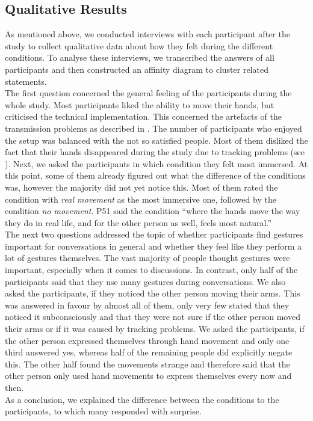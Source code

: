 \documentclass[english,runningheads,a4paper]{llncs}[2018/03/10]
\begin{document}
\subsection{Qualitative Results}
As mentioned above, we conducted interviews with each participant after the study to collect qualitative data about how they felt during the different conditions. 
To analyse these interviews, we transcribed the answers of all participants and then constructed an affinity diagram to cluster related statements.  \\ \linebreak
The first question concerned the general feeling of the participants during the whole study.
Most participants liked the ability to move their hands, but criticised the technical implementation. 
This concerned the artefacts of the transmission problems as described in .
The number of participants who enjoyed the setup was balanced with the not so satisfied people. 
Most of them disliked the fact that their hands disappeared during the study due to tracking problems (see ).
Next, we asked the participants in which condition they felt most immersed. 
At this point, some of them already figured out what the difference of the conditions was, however the majority did not yet notice this. 
Most of them rated the condition with \textit{real movement} as the most immersive one, followed by the condition \textit{no movement}. 
P51 said the condition ``where the hands move the way they do in real life, and for the other person as well, feels most natural.''\\ \linebreak
The next two questions addressed the topic of whether participants find gestures important for conversations in general and whether they feel like they perform a lot of gestures themselves. 
The vast majority of people thought gestures were important, especially when it comes to discussions.
In contrast, only half of the participants said that they use many gestures during conversations. 
We also asked the participants, if they noticed the other person moving their arms. 
This was answered in favour by almost all of them, only very few stated that they noticed it subconsciously and that they were not sure if the other person moved their arms or if it was caused by tracking problems. 
We asked the participants, if the other person expressed themselves through hand movement and only one third answered yes, whereas half of the remaining people did explicitly negate this.
The other half found the movements strange and therefore said that the other person only used hand movements to express themselves every now and then. \\ \linebreak
As a conclusion, we explained the difference between the conditions to the participants, to which many responded with surprise.
\end{document}
